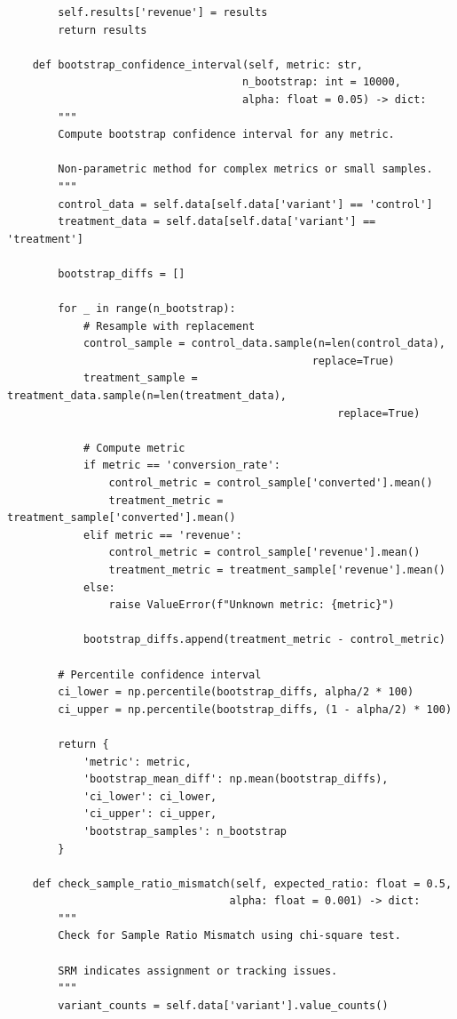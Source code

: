 \begin{lstlisting}
        self.results['revenue'] = results
        return results

    def bootstrap_confidence_interval(self, metric: str,
                                     n_bootstrap: int = 10000,
                                     alpha: float = 0.05) -> dict:
        """
        Compute bootstrap confidence interval for any metric.

        Non-parametric method for complex metrics or small samples.
        """
        control_data = self.data[self.data['variant'] == 'control']
        treatment_data = self.data[self.data['variant'] == 'treatment']

        bootstrap_diffs = []

        for _ in range(n_bootstrap):
            # Resample with replacement
            control_sample = control_data.sample(n=len(control_data),
                                                replace=True)
            treatment_sample = treatment_data.sample(n=len(treatment_data),
                                                    replace=True)

            # Compute metric
            if metric == 'conversion_rate':
                control_metric = control_sample['converted'].mean()
                treatment_metric = treatment_sample['converted'].mean()
            elif metric == 'revenue':
                control_metric = control_sample['revenue'].mean()
                treatment_metric = treatment_sample['revenue'].mean()
            else:
                raise ValueError(f"Unknown metric: {metric}")

            bootstrap_diffs.append(treatment_metric - control_metric)

        # Percentile confidence interval
        ci_lower = np.percentile(bootstrap_diffs, alpha/2 * 100)
        ci_upper = np.percentile(bootstrap_diffs, (1 - alpha/2) * 100)

        return {
            'metric': metric,
            'bootstrap_mean_diff': np.mean(bootstrap_diffs),
            'ci_lower': ci_lower,
            'ci_upper': ci_upper,
            'bootstrap_samples': n_bootstrap
        }

    def check_sample_ratio_mismatch(self, expected_ratio: float = 0.5,
                                   alpha: float = 0.001) -> dict:
        """
        Check for Sample Ratio Mismatch using chi-square test.

        SRM indicates assignment or tracking issues.
        """
        variant_counts = self.data['variant'].value_counts()


\end{lstlisting}
